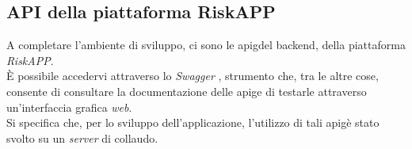 \subsection*{API della piattaforma RiskAPP}
A completare l'ambiente di sviluppo, ci sono le \gls{apig}\glsoccur del \gls{backend}\glsoccur, della piattaforma \emph{RiskAPP}.\\
È possibile accedervi attraverso lo \emph{Swagger} \cite{site:swagger}, strumento che, tra le altre cose, consente di consultare la documentazione delle \gls{apig}\glsoccur e di testarle attraverso un'interfaccia grafica \emph{web}.\\
Si specifica che, per lo sviluppo dell'applicazione, l'utilizzo di tali \gls{apig}\glsoccur è stato svolto su un \emph{server} di collaudo.